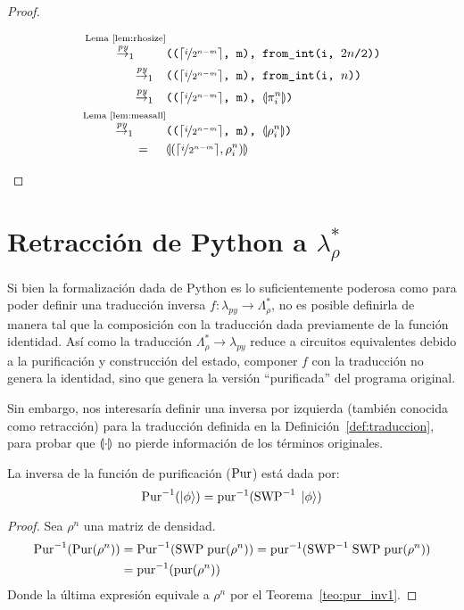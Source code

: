 \begin{proof}
\begin{itemize}
\begin{align*}
\stackrel{\textrm{Lema~\ref{lem:rhosize}}}{\overset{\textit{py}}{\rightarrow}_1}&\texttt{((}\lceil \nicefrac{i}{2^{n-m}}\rceil\texttt{, m), from\_int(i, $2n$/2))}\\
\overset{\textit{py}}{\rightarrow}_1 \quad&\texttt{((}\lceil \nicefrac{i}{2^{n-m}}\rceil\texttt{, m), from\_int(i, $n$))}\\
\overset{\textit{py}}{\rightarrow}_1\quad &\texttt{((}\lceil \nicefrac{i}{2^{n-m}}\rceil\texttt{, m), \ensuremath{\llparenthesis \pi^n_i \rrparenthesis})}\\
\stackrel{\textrm{Lema~\ref{lem:measall}}}{\overset{\textit{py}}{\rightarrow}_1}&\texttt{((}\lceil \nicefrac{i}{2^{n-m}}\rceil\texttt{, m), } \llparenthesis \rho_i^n \rrparenthesis\texttt{)}\\
=\quad\;\,&\llparenthesis (\lceil \nicefrac{i}{2^{n-m}}\rceil, \rho_i^n) \rrparenthesis
\end{align*}
\end{itemize}
\end{proof}

\section{\texorpdfstring{Retracción de Python a $\lambda_\rho^*$}{Retracción de Python a Lambda Rho*}}\label{sec:retraccion}

Si bien la formalización dada de Python es lo suficientemente poderosa como para poder definir una traducción inversa $f: \lambda_\textit{py} \rightarrow \Lambda_\rho^*$, no es posible definirla de manera tal que la composición con la traducción dada previamente de la función identidad. 
Así como la traducción $\Lambda_\rho^* \rightarrow \lambda_\textit{py}$ reduce a circuitos equivalentes debido a la purificación y construcción del estado, componer $f$ con la traducción no genera la identidad, sino que genera la versión ``purificada'' del programa original.

Sin embargo, nos interesaría definir una inversa por izquierda (también conocida como retracción) para la traducción definida en la Definición~\ref{def:traduccion}, para probar que $\llparenthesis \cdot \rrparenthesis$ no pierde información de los términos originales.

\begin{teorema}\label{teo:pur_inv}
    La inversa de la función de purificación ($\text{Pur}$) está dada por:
    \[\text{Pur}^{-1}(\ket{\phi}) = \text{pur}^{-1}(\text{SWP}^{-1}\;\ket{\phi})\]
\end{teorema}
\begin{proof}
Sea $\rho^n$ una matriz de densidad.
\begin{align*}
    \text{Pur}^{-1}(\text{Pur}(\rho^n)) &= \text{Pur}^{-1}(\text{SWP}\;\text{pur}(\rho^n)) = \text{pur}^{-1}(\text{SWP}^{-1}\;\text{SWP}\;\text{pur}(\rho^n)) \\
    &= \text{pur}^{-1}(\text{pur}(\rho^n))
\end{align*}
Donde la última expresión equivale a $\rho^n$ por el Teorema~\ref{teo:pur_inv1}.
\end{proof}

